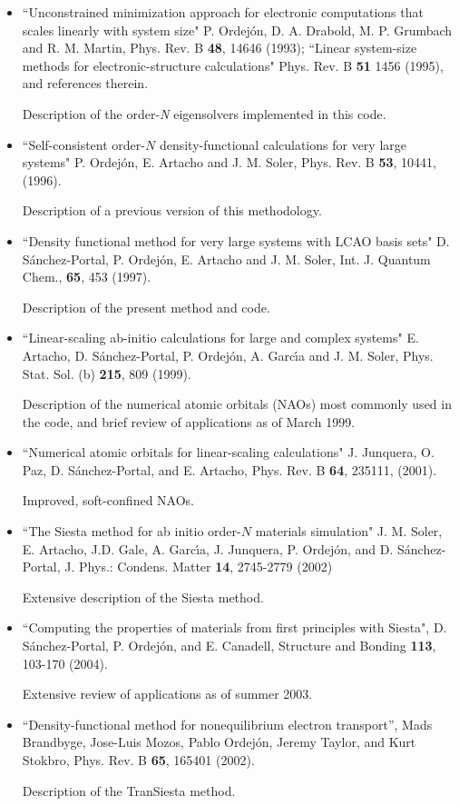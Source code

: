 \documentclass[11pt]{article}
\begin{document}
\begin{itemize}

\item
``Unconstrained minimization approach for electronic computations
that scales linearly with system size"
P. Ordej\'on, D. A. Drabold, M. P. Grumbach and R. M. Martin,
Phys. Rev. B {\bf 48}, 14646 (1993);
``Linear system-size methods for electronic-structure calculations"
Phys. Rev. B {\bf 51} 1456 (1995), and references therein.

Description of the order-{\it N} eigensolvers
implemented in this code.

\item
``Self-consistent order-$N$ density-functional
calculations for very large systems"
P. Ordej\'on, E. Artacho and J. M. Soler,
Phys. Rev. B {\bf 53}, 10441, (1996).

Description of a previous version of this methodology.

\item
``Density functional method for very large systems with LCAO basis sets"
D. S\'anchez-Portal, P. Ordej\'on, E. Artacho and J. M. Soler,
Int. J. Quantum Chem., {\bf 65}, 453 (1997).

Description of the present method and code.

\item
``Linear-scaling ab-initio calculations for large and complex systems"
E. Artacho, D. S\'anchez-Portal, P. Ordej\'on, A. Garc\'{\i}a and
J. M. Soler, Phys. Stat. Sol. (b) {\bf 215}, 809 (1999).

Description of the numerical atomic orbitals (NAOs) most commonly
used in the code, and brief review of applications as of March 1999.

\item
``Numerical atomic orbitals for linear-scaling calculations"
J. Junquera, O. Paz, D. S\'anchez-Portal, and E. Artacho, Phys. Rev. B
 {\bf 64}, 235111, (2001).

Improved, soft-confined NAOs.

\item
``The {\sc Siesta} method for ab initio order-$N$ materials simulation"
J. M. Soler, E. Artacho, J.D. Gale, A. Garc\'{\i}a, J. Junquera, P. Ordej\'on,
and D. S\'anchez-Portal, J. Phys.: Condens. Matter {\bf 14}, 2745-2779 (2002)

Extensive description of the {\sc Siesta} method.

\item
``Computing the properties of materials from first principles
with  {\sc Siesta}", D. S\'anchez-Portal, P. Ordej\'on,
and E. Canadell, Structure and Bonding {\bf 113},
103-170 (2004).

Extensive review of applications as of summer 2003.

\item
 ``Density-functional method for nonequilibrium electron transport'',
 Mads Brandbyge, Jose-Luis Mozos, Pablo Ordej\'on, Jeremy Taylor,
 and Kurt Stokbro, Phys. Rev. B {\bf 65}, 165401 (2002).

 Description of the {\sc TranSiesta} method.

\end{itemize}
\end{document}
